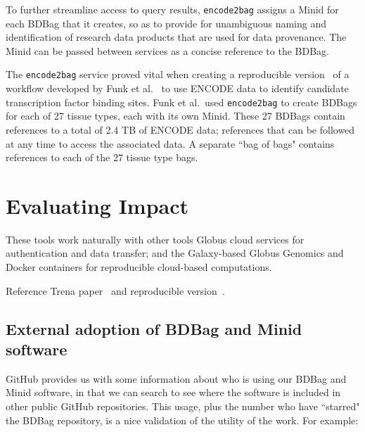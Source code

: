 \documentclass[11pt]{article}
\begin{document}
To further streamline access to query results, \texttt{encode2bag} assigns a Minid for each BDBag that it creates,
so as to provide for unambiguous naming and identification of research data products that are used for data provenance.
The Minid can be passed between services as a concise reference to the BDBag.

The \texttt{encode2bag} service proved vital when creating a reproducible version~\cite{madduri2018reproducible}
of a workflow developed by Funk et al.~\cite{funk18} to use ENCODE data to identify candidate
transcription factor binding sites. 
Funk et al.\ used
 \texttt{encode2bag} to create BDBags for each of 27 tissue types, each with its own Minid.
These 27 BDBags contain references to a total of 2.4 TB of ENCODE data;
references that can be followed at any time to access the associated data.
A separate ``bag of bags" contains references to each of the 27 tissue type bags. 

\section{Evaluating Impact}

These tools work naturally with other tools
Globus cloud services for authentication and data transfer; 
and the Galaxy-based Globus Genomics and Docker containers for reproducible cloud-based computations. 

Reference Trena paper~\cite{funk18} and reproducible version~\cite{madduri2018reproducible}.


\subsection{External adoption of BDBag and Minid software}

GitHub provides us with some information about who is using our BDBag and Minid software,
in that we can search to see where the software is included in other public GitHub repositories. 
This usage, plus the number who have ``starred" the BDBag repository, is a nice validation of the
utility of the work. For example:
\end{document}
